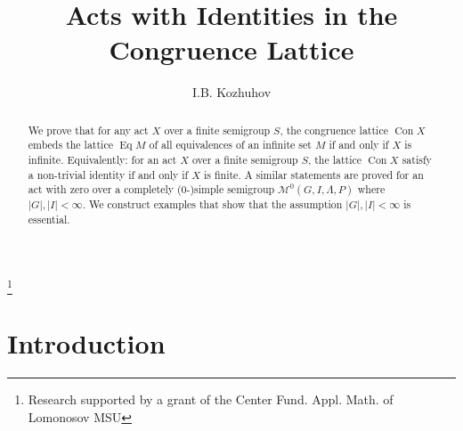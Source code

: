 \documentclass{birkau}
\numberwithin{equation}{section}
\theoremstyle{plain}
\theoremstyle{definition}
\DeclareMathOperator{\Con}{Con}
\DeclareMathOperator{\Eq}{Eq}
\begin{document}
	
    \title[Acts with Identities in the Congruence Lattice]{Acts with Identities in the Congruence Lattice}

    \author[I.B. Kozhuhov]{I.B. Kozhuhov}
    \address{National Research University MIET, \\
    Faculty of Mechanics and Mathematics of Lomonosov Moscow State University, \\
    Center of Fundamental and Applied Mathematics of Lomonosov MSU \\
    Moscow\\Russia}

    \address{National Research University MIET\\Moscow\\Russia}
    
    \thanks{Research supported by a grant of the Center Fund. Appl. Math. of Lomonosov MSU}
	

    \begin{abstract}
    We prove that for any act $X$ over a finite semigroup $S$, the congruence lattice $\Con X$ embeds the lattice $\Eq M$ of all equivalences of an infinite set $M$ if and only if $X$ is infinite. Equivalently: for an act $X$ over a finite semigroup $S$, the lattice $\Con X$ satisfy a non-trivial identity if and only if $X$ is finite. A similar statements are proved for an act with zero over a completely (0-)simple semigroup $\mathcal M^0(G,I,\Lambda,P)$ where $|G|,|I| <\infty$. We construct examples that show that the assumption $|G|,|I| <\infty$ is essential.
    \end{abstract}
	
	\maketitle
	
	\section{Introduction}
	
\end{document}
